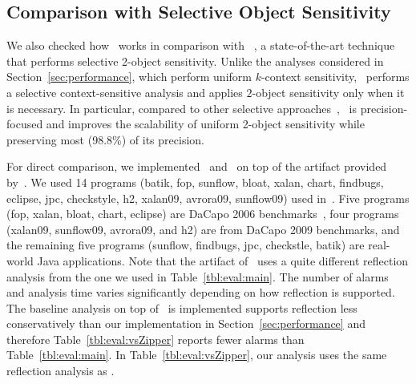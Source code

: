 %


\subsection{Comparison with Selective Object Sensitivity}\label{sec:SelectiveCtx}

We also checked how \ours~works in comparison with \Zipper~\cite{Li2018a,ZipperJournal20}, a state-of-the-art technique that performs selective 2-object sensitivity. 
Unlike the analyses considered in Section~\ref{sec:performance}, which perform uniform $k$-context sensitivity,  \Zipper~performs a selective context-sensitive analysis and applies $2$-object sensitivity only when it is necessary. In particular, compared to other selective approaches~\cite{Li2018b,JeJeChOh17,Smaragdakis2014,Graphick20}, \Zipper~is precision-focused and 
improves the scalability of uniform 2-object sensitivity while preserving most (98.8\%) of its precision. 
%

For direct comparison, we implemented \ours~and \oneobjHT~on top of the artifact provided by~\cite{Li2018a}.
We used 14 programs (batik, fop, sunflow, bloat, xalan, chart, findbugs, eclipse, jpc, checkstyle, h2, xalan09, avrora09, sunflow09) used in~\cite{Li2018a}.
Five programs (fop, xalan, bloat, chart, eclipse) are DaCapo 2006 benchmarks~\cite{Blackburn2006}, four programs (xalan09, sunflow09, avrora09, and h2) are from DaCapo 2009 benchmarks, and the remaining five programs (sunflow, findbugs, jpc, checkstle, batik) are real-world Java applications.
Note that the artifact of~\cite{Li2018a} uses a quite different reflection analysis from the one we used in Table~\ref{tbl:eval:main}.
The number of alarms and analysis time varies significantly depending on how reflection is supported. 
The baseline analysis on top of \Zipper~is implemented supports reflection less conservatively than our implementation in Section~\ref{sec:performance} and therefore Table~\ref{tbl:eval:vsZipper} reports fewer alarms than Table~\ref{tbl:eval:main}. In Table~\ref{tbl:eval:vsZipper}, our analysis uses the same reflection analysis as \Zipper. 


